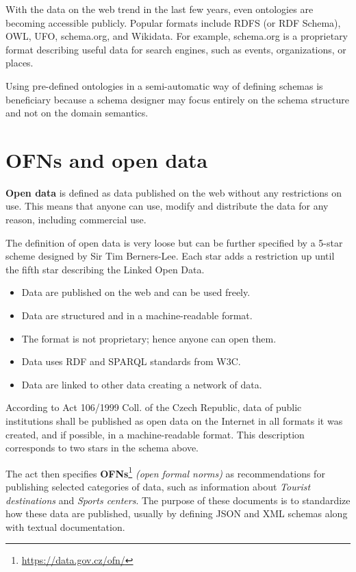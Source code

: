 With the data on the web \cite{data-on-the-web} trend in the last few years, even ontologies are becoming accessible publicly. Popular formats include RDFS (or RDF Schema), OWL, UFO, schema.org, and Wikidata. For example, schema.org is a proprietary format describing useful data for search engines, such as events, organizations, or places.

Using pre-defined ontologies in a semi-automatic way of defining schemas is beneficiary because a schema designer may focus entirely on the schema structure and not on the domain semantics.

\section*{OFNs and open data}

\textbf{Open data} is defined as data published on the web without any restrictions on use. This means that anyone can use, modify and distribute the data for any reason, including commercial use.

The definition of open data is very loose but can be further specified by a 5-star scheme designed by Sir Tim Berners-Lee. Each star adds a restriction up until the fifth star describing the Linked Open Data.
\begin{itemize}[noitemsep,leftmargin=2cm]
    \item [1 $\bigstar$] Data are published on the web and can be used freely.
    \item [2 $\bigstar$] Data are structured and in a machine-readable format.
    \item [3 $\bigstar$] The format is not proprietary; hence anyone can open them.
    \item [4 $\bigstar$] Data uses RDF and SPARQL standards from W3C.
    \item [5 $\bigstar$] Data are linked to other data creating a network of data.
\end{itemize}

\smallskip

According to Act 106/1999 Coll. of the Czech Republic, data of public institutions shall be published as open data on the Internet in all formats it was created, and if possible, in a machine-readable format. This description corresponds to two stars in the schema above.

The act then specifies \textbf{OFNs}\footnote{\url{https://data.gov.cz/ofn/}} \textit{(open formal norms)} as recommendations for publishing selected categories of data, such as information about \textit{Tourist destinations} and \textit{Sports centers}. The purpose of these documents is to standardize how these data are published, usually by defining JSON and XML schemas along with textual documentation.

